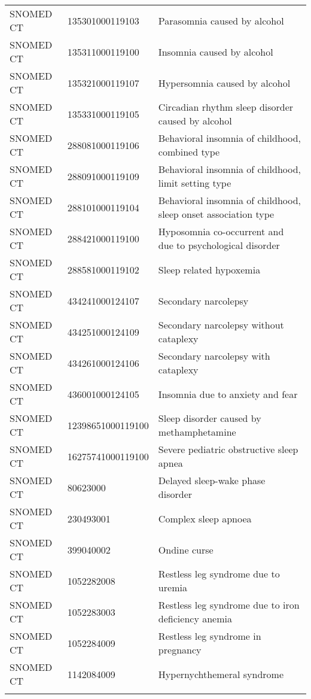 \begin{longtable}{p{}p{}p{}}
  SNOMED CT & 135301000119103 & Parasomnia caused by alcohol \\ 
  SNOMED CT & 135311000119100 & Insomnia caused by alcohol \\ 
  SNOMED CT & 135321000119107 & Hypersomnia caused by alcohol \\ 
  SNOMED CT & 135331000119105 & Circadian rhythm sleep disorder caused by alcohol \\ 
  SNOMED CT & 288081000119106 & Behavioral insomnia of childhood, combined type \\ 
  SNOMED CT & 288091000119109 & Behavioral insomnia of childhood, limit setting type \\ 
  SNOMED CT & 288101000119104 & Behavioral insomnia of childhood, sleep onset association type \\ 
  SNOMED CT & 288421000119100 & Hyposomnia co-occurrent and due to psychological disorder \\ 
  SNOMED CT & 288581000119102 & Sleep related hypoxemia \\ 
  SNOMED CT & 434241000124107 & Secondary narcolepsy \\ 
  SNOMED CT & 434251000124109 & Secondary narcolepsy without cataplexy \\ 
  SNOMED CT & 434261000124106 & Secondary narcolepsy with cataplexy \\ 
  SNOMED CT & 436001000124105 & Insomnia due to anxiety and fear \\ 
  SNOMED CT & 12398651000119100 & Sleep disorder caused by methamphetamine \\ 
  SNOMED CT & 16275741000119100 & Severe pediatric obstructive sleep apnea \\ 
  SNOMED CT & 80623000 & Delayed sleep-wake phase disorder \\ 
  SNOMED CT & 230493001 & Complex sleep apnoea \\ 
  SNOMED CT & 399040002 & Ondine curse \\ 
  SNOMED CT & 1052282008 & Restless leg syndrome due to uremia \\ 
  SNOMED CT & 1052283003 & Restless leg syndrome due to iron deficiency anemia \\ 
  SNOMED CT & 1052284009 & Restless leg syndrome in pregnancy \\ 
  SNOMED CT & 1142084009 & Hypernychthemeral syndrome \\ 
  \hline
\label{tab:codes_insomnia}
\end{longtable}
